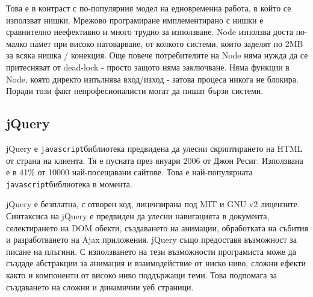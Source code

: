 \documentclass[a4paper]{article}
\def\js{\texttt{javascript}}
\begin{document}
  Това е в контраст с по-популярния модел на едновременна работа, в който се използват нишки. Мрежово програмиране имплементирано с нишки е сравнително неефективно и много трудно за използване. Node използва доста по-малко памет при високо натоварване, от колкото системи, които заделят по 2MB за всяка нишка / конекция. Още повече потребителите на Node няма нужда да се притесняват от dead-lock - просто защото няма заключване. Няма функции в Node, която директо изпълнява вход/изход - затова процеса никога не блокира. Поради този факт непрофесионалисти могат да пишат бързи системи.

    
  \subsection{jQuery}
  jQuery \cite{jquery} е \js библиотека предвидена да улесни скриптирането на HTML от страна на клиента. Тя е пусната през януари 2006 от Джон Ресиг. Използвана е в 41\% от 10000 най-посещавани сайтове. Това е най-популярната \js библиотека в момента.

  jQuery е безплатна, с отворен код, лицензирана под MIT и GNU v2 лицензите. Синтаксиса на jQuery е предвиден да улесни навигацията в документа, селектирането на DOM обекти, създаването на анимации, обработката на събития и разработването на Ajax приложения. jQuery също предоставя възможност за писане на плъгини. С използването на тези възможности програмиста може да създаде абстракции за анимация и взаимодействие от ниско ниво, сложни ефекти както и компоненти от високо ниво поддържащи теми. Това подпомага за създаването на сложни и динамични уеб страници.
\end{document}
